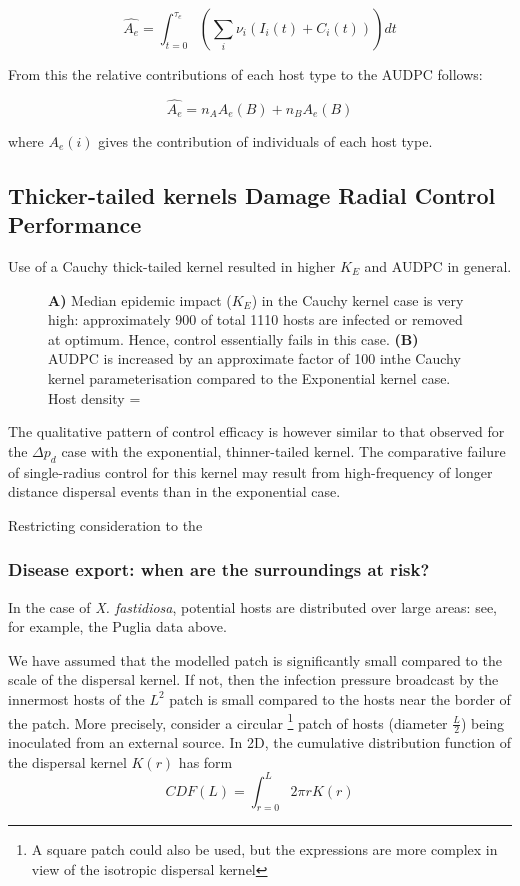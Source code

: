 \documentclass[prstpaper]{revtex4-2}
\begin{document}
\begin{equation}
    \hat{A_{e}} = \int_{t = 0}^{\tau_{e}} \left( \sum_{i} \nu_{i} (I_{i}(t) + C_{i}(t)) \right) dt
\end{equation}

From this the relative contributions of each host type to the AUDPC follows:

\begin{equation}
    \hat{A_{e}} = n_{A} A_{e}(B) + n_{B} A_{e} (B)
\end{equation}

where $ A_{e} (i)$ gives the contribution of individuals of each host type.

\subsection{Thicker-tailed kernels Damage Radial Control Performance}

%
%
%

Use of a Cauchy thick-tailed kernel resulted in higher $K_{E}$ and AUDPC in general. 

\begin{figure}[hbt!]

\caption{\label{} \textbf{A)} Median epidemic impact ($K_{E}$) in the Cauchy kernel case is very high: approximately 900 of total 1110 hosts are infected or removed at optimum. Hence, control essentially fails in this case. \textbf{(B)} AUDPC is increased by an approximate factor of 100 inthe Cauchy kernel parameterisation compared to the Exponential kernel case. Host density = }
\end{figure}

The qualitative pattern of control efficacy is however similar to that observed for the $\Delta p_{d}$ case with the exponential, thinner-tailed kernel. The comparative failure of single-radius control for this kernel may result from high-frequency of longer distance dispersal events than in the exponential case. 

Restricting consideration to the 


\subsubsection{Disease export: when are the surroundings at risk?}

In the case of \emph{X. fastidiosa}, potential hosts are distributed over large areas: see, for example, the Puglia data above. 

We have assumed that the modelled patch is significantly small compared to the scale of the dispersal kernel. If not, then the infection pressure broadcast by the innermost hosts of the $L^{2}$ patch is small compared to the hosts near the border of the patch. 
More precisely, consider a circular \footnote{A square patch could also be used, but the expressions are more complex in view of the isotropic dispersal kernel} patch of hosts (diameter $\frac{L}{2}$) being inoculated from an external source. In 2D, the cumulative distribution function of the  dispersal kernel $K(r)$  has form
\begin{equation}
    CDF(L) = \int_{r=0}^{L} 2 \pi rK(r)
\end{equation}
\end{document}
